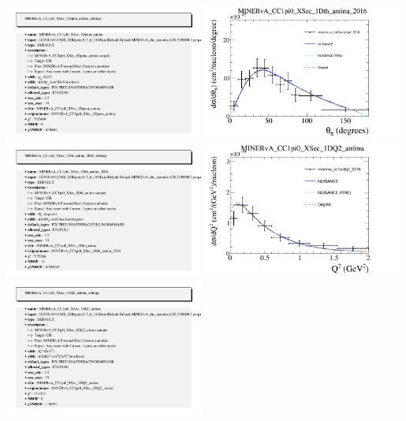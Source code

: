 \documentclass{article}
\begin{document}
\includegraphics[width=0.49\textwidth]{figures/minerva_cc1pi0muonmom_2016_info.png}
\centering
\includegraphics[width=0.49\textwidth]{figures/minerva_cc1pi0pionangle_2016_comp.png}
\includegraphics[width=0.49\textwidth]{figures/minerva_cc1pi0pionangle_2016_info.png}
\centering
\includegraphics[width=0.49\textwidth]{figures/minerva_cc1pi0q2_2016_comp.png}
\includegraphics[width=0.49\textwidth]{figures/minerva_cc1pi0q2_2016_info.png}
\end{document}
